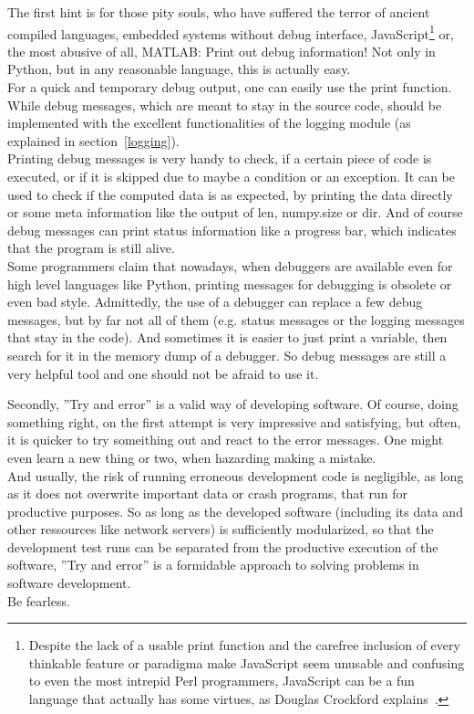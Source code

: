 		The first hint is for those pity souls, who have suffered the terror of ancient compiled languages, embedded systems without debug interface, JavaScript\footnote{Despite  the lack of a usable print function and the carefree inclusion of every thinkable feature or paradigma make JavaScript seem unusable and confusing to even the most intrepid Perl programmers, JavaScript can be a fun language that actually has some virtues, as Douglas Crockford explains~\cite{Crockford}.} or, the most abusive of all, MATLAB:
		Print out debug information! Not only in Python, but in any reasonable language, this is actually easy.\\
		For a quick and temporary debug output, one can easily use the {\normalfont \ttfamily print} function.
		While debug messages, which are meant to stay in the source code, should be implemented with the excellent functionalities of the {\normalfont \ttfamily logging} module (as explained in section~\ref{logging}).\\
		Printing debug messages is very handy to check, if a certain piece of code is executed, or if it is skipped due to maybe a condition or an exception.
		It can be used to check if the computed data is as expected, by printing the data directly or some meta information like the output of {\normalfont \ttfamily len}, {\normalfont \ttfamily numpy.size} or {\normalfont \ttfamily dir}.
		And of course debug messages can print status information like a progress bar, which indicates that the program is still alive.\\
		Some programmers claim that nowadays, when debuggers are available even for high level languages like Python, printing messages for debugging is obsolete or even bad style.
		Admittedly, the use of a debugger can replace a few debug messages, but by far not all of them (e.g. status messages or the logging messages that stay in the code).
		And sometimes it is easier to just print a variable, then search for it in the memory dump of a debugger.
		So debug messages are still a very helpful tool and one should not be afraid to use it.

		Secondly, ''Try and error'' is a valid way of developing software.
		Of course, doing something right, on the first attempt is very impressive and satisfying, but often, it is quicker to try someithing out and react to the error messages.
		One might even learn a new thing or two, when hazarding making a mistake.\\
		And usually, the risk of running erroneous development code is negligible, as long as it does not overwrite important data or crash programs, that run for productive purposes.
		So as long as the developed software (including its data and other ressources like network servers) is sufficiently modularized, so that the development test runs can be separated from the productive execution of the software, ''Try and error'' is a formidable approach to solving problems in software development.\\
		Be fearless.

